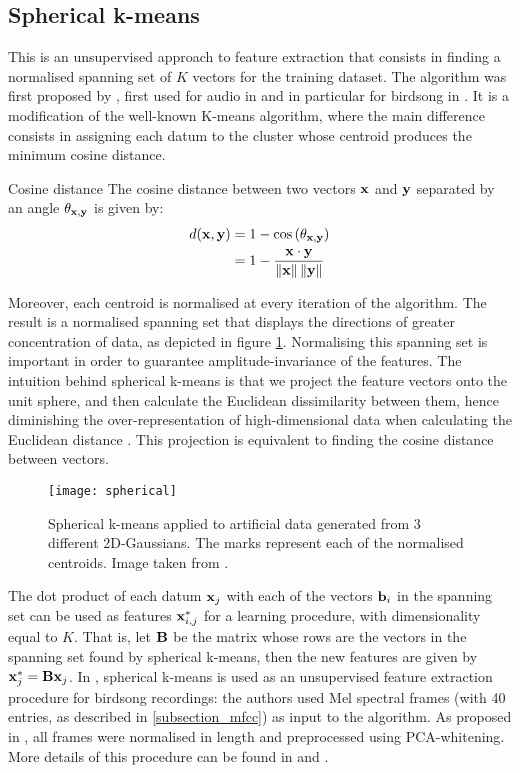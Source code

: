 \documentclass[../main.tex]{subfiles} \label{chapter_soa}
\begin{document}
\subsection{Spherical k-means} \label{subsection_spherical}
This is an unsupervised approach to feature extraction that consists in finding a normalised spanning set of $K$ vectors for the training dataset. The algorithm was first proposed by \cite{Coates2012}, first used for audio in \cite{Dieleman2013} and in particular for birdsong in \cite{Stowell2014}. It is a modification of the well-known K-means algorithm, where the main difference consists in assigning each datum to the cluster whose centroid produces the minimum cosine distance.
\begin{definition}{Cosine distance} \label{def_cosine_distance}
The cosine distance between two vectors $\mathbf{x}$ and $\mathbf{y}$ separated by an angle $\theta_{\mathbf{x}, \mathbf{y}}$ is given by:
\begin{align*}
d(\mathbf{x}, \mathbf{y}) &= 1 - \cos{(\theta_{\mathbf{x}, \mathbf{y}})}\\
&= 1 - \frac{\mathbf{x} \cdot \mathbf{y}}{\left\lVert\mathbf{x}\right\rVert\left\lVert\mathbf{y}\right\rVert}
\end{align*}
\end{definition}
\par Moreover, each centroid is normalised at every iteration of the algorithm. The result is a normalised spanning set that displays the directions of greater concentration of data, as depicted in figure \ref{fig_spherical}. Normalising this spanning set is important in order to guarantee amplitude-invariance of the features. The intuition behind spherical k-means is that we project the feature vectors onto the unit sphere, and then calculate the Euclidean dissimilarity between them, hence diminishing the over-representation of high-dimensional data when calculating the Euclidean distance \cite{Hornik2012}. This projection is equivalent to finding the cosine distance between vectors. 

\begin{figure}[t]
\centering
\texttt{[image: spherical]}
\caption{Spherical k-means applied to artificial data generated from 3 different 2D-Gaussians. The marks represent each of the normalised centroids. Image taken from \cite{Stowell2014}.}
\label{fig_spherical}
\end{figure}
\par The dot product of each datum $\mathbf{x}_j$ with each of the vectors $\mathbf{b}_i$ in the spanning set can be used as features $\mathbf{x}^*_{i,j}$ for a learning procedure, with dimensionality equal to $K$. That is, let $\mathbf{B}$ be the matrix whose rows are the vectors in the spanning set found by spherical k-means, then the new features are given by $\mathbf{x}^*_j = \mathbf{Bx}_j$. In \cite{Stowell2014}, spherical k-means is used as an unsupervised feature extraction procedure for birdsong recordings: the authors used Mel spectral frames (with 40 entries, as described in \ref{subsection_mfcc}) as input to the algorithm. As proposed in \cite{Dieleman2013}, all frames were normalised in length and preprocessed using PCA-whitening. More details of this procedure can be found in \cite{Stowell2014} and \cite{Dieleman2013}.
\end{document}
